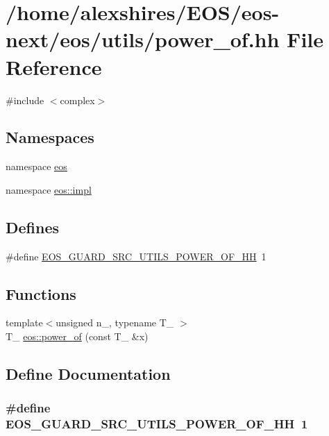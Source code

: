 \hypertarget{power__of_8hh}{
\section{/home/alexshires/EOS/eos-\/next/eos/utils/power\_\-of.hh File Reference}
\label{power__of_8hh}
}
{\ttfamily \#include $<$complex$>$}\par
\subsection*{Namespaces}
\begin{DoxyCompactItemize}
\item 
namespace \hyperlink{namespaceeos}{eos}
\item 
namespace \hyperlink{namespaceeos_1_1impl}{eos::impl}
\end{DoxyCompactItemize}
\subsection*{Defines}
\begin{DoxyCompactItemize}
\item 
\#define \hyperlink{power__of_8hh_a62463aecc962f21a779b7750e2eab28d}{EOS\_\-GUARD\_\-SRC\_\-UTILS\_\-POWER\_\-OF\_\-HH}~1
\end{DoxyCompactItemize}
\subsection*{Functions}
\begin{DoxyCompactItemize}
\item 
{\footnotesize template$<$unsigned n\_\-, typename T\_\- $>$ }\\T\_\- \hyperlink{namespaceeos_a89d53e5e358a7428b14c811668193e3f}{eos::power\_\-of} (const T\_\- \&x)
\end{DoxyCompactItemize}


\subsection{Define Documentation}
\hypertarget{power__of_8hh_a62463aecc962f21a779b7750e2eab28d}{
\subsubsection[{EOS\_\-GUARD\_\-SRC\_\-UTILS\_\-POWER\_\-OF\_\-HH}]{\setlength{\rightskip}{0pt plus 5cm}\#define EOS\_\-GUARD\_\-SRC\_\-UTILS\_\-POWER\_\-OF\_\-HH~1}}
\label{power__of_8hh_a62463aecc962f21a779b7750e2eab28d}
